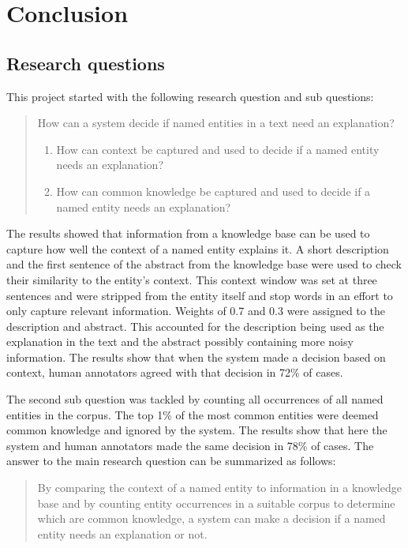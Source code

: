 \documentclass[
10pt, %
a4paper, %
oneside, %
headinclude,footinclude, %
] {book}%
\begin{document}
\chapter{Conclusion}

\section{Research questions}
This project started with the following research question and sub questions:
\begin{quote}
  How can a system decide if named entities in a text need an explanation?
  \begin{enumerate}
    \item How can context be captured and used to decide if a named entity needs an explanation?
    \item How can common knowledge be captured and used to decide if a named entity needs an explanation?
  \end{enumerate}
\end{quote}

The results showed that information from a knowledge base can be used to capture how well the context of a named entity explains it.
A short description and the first sentence of the abstract from the knowledge base were used to check their similarity to the entity's context.
This context window was set at three sentences and were stripped from the entity itself and stop words in an effort to only capture relevant information.
Weights of 0.7 and 0.3 were assigned to the description and abstract.
This accounted for the description being used as the explanation in the text and the abstract possibly containing more noisy information.
The results show that when the system made a decision based on context, human annotators agreed with that decision in 72\% of cases.

The second sub question was tackled by counting all occurrences of all named entities in the corpus.
The top 1\% of the most common entities were deemed common knowledge and ignored by the system.
The results show that here the system and human annotators made the same decision in 78\% of cases.
The answer to the main research question can be summarized as follows:

\begin{quote}
  By comparing the context of a named entity to information in a knowledge base and by counting entity occurrences in a suitable corpus to determine which are common knowledge, a system can make a decision if a named entity needs an explanation or not.
\end{quote}
\end{document}

